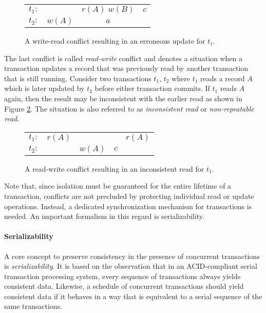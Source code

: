 \begin{figure}[h!]
    \centering
    \begin{tabular}{r c c c}
        $t_1:$ &        & $r(A)\; w(B)$ & $c$ \\
        $t_2:$ & $w(A)$ & $a$           &     \\
    \end{tabular}
    \caption{A write-read conflict resulting in an erroneous update for $t_1$.}
    \label{fig:wr-conflict}
\end{figure}

The last conflict is called \emph{read-write} conflict and denotes a situation
when a transaction updates a record that was previously read by another
transaction that is still running. Consider two transactions $t_1$, $t_2$ where
$t_1$ reads a record $A$ which is later updated by $t_2$ before either
transaction commits. If $t_1$ reads $A$ again, then the result may be
inconsistent with the earlier read as shown in Figure \ref{fig:rw-conflict}. The
situation is also referred to as \emph{inconsistent read} or
\emph{non-repeatable read}.

\begin{figure}[h!]
    \centering
    \begin{tabular}{r c c c c}
        $t_1:$ & $r(A)$ &        &     & $r(A)$ \\
        $t_2:$ &        & $w(A)$ & $c$ &        \\
    \end{tabular}
    \caption{A read-write conflict resulting in an inconsistent read for $t_1$.}
    \label{fig:rw-conflict}
\end{figure}

Note that, since isolation must be guaranteed for the entire lifetime of a
transaction, conflicts are not precluded by protecting individual read or update
operations. Instead, a dedicated synchronization mechanism for transactions is
needed. An important formalism in this regard is serializability.

\paragraph{Serializability}

A core concept to preserve consistency in the presence of concurrent
transactions is \emph{serializability}. It is based on the observation that in
an ACID-compliant serial transaction processing system, every sequence of
transactions always yields consistent data. Likewise, a schedule of concurrent
transactions should yield consistent data if it behaves in a way that is
equivalent to a serial sequence of the same transactions.

